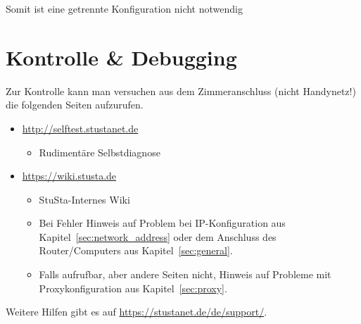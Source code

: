 \documentclass[a4paper,12pt]{scrartcl}
\begin{document}
Somit ist eine getrennte Konfiguration nicht notwendig

\section{Kontrolle \& Debugging}
\label{sec:debugging}
Zur Kontrolle kann man versuchen aus dem Zimmeranschluss (nicht Handynetz!) die folgenden Seiten aufzurufen.
\begin{itemize}
	\item \url{http://selftest.stustanet.de}
	\begin{itemize}
		\item Rudimentäre Selbstdiagnose
	\end{itemize}
	\item \url{https://wiki.stusta.de}
	\begin{itemize}
		\item StuSta-Internes Wiki
		\item Bei Fehler Hinweis auf Problem bei IP-Konfiguration aus Kapitel~\ref{sec:network_address} oder dem Anschluss des Router/Computers aus Kapitel~\ref{sec:general}.
		\item Falls aufrufbar, aber andere Seiten nicht, Hinweis auf Probleme mit Proxykonfiguration aus Kapitel~\ref{sec:proxy}.
	\end{itemize}
\end{itemize}
Weitere Hilfen gibt es auf \mbox{\url{https://stustanet.de/de/support/}}.
\end{document}
